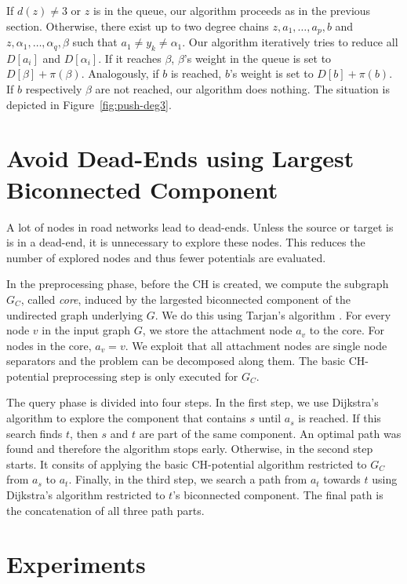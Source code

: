 \documentclass[a4paper,UKenglish,cleveref, autoref]{lipics-v2019}
\begin{document}
If $d(z)\neq 3$ or $z$ is in the queue, our algorithm proceeds as in the previous section.
Otherwise, there exist up to two degree chains $z,a_1,\ldots,a_p,b$ and $z,\alpha_1,\ldots,\alpha_q,\beta$ such that $a_1\neq y_k \neq \alpha_1$.
Our algorithm iteratively tries to reduce all $D[a_i]$ and $D[\alpha_i]$.
If it reaches $\beta$, $\beta$'s weight in the queue is set to $D[\beta]+\pi(\beta)$.
Analogously, if $b$ is reached, $b$'s weight is set to $D[b]+\pi(b)$.
If $b$ respectively $\beta$ are not reached, our algorithm does nothing.
The situation is depicted in Figure~\ref{fig:push-deg3}.

\section{Avoid Dead-Ends using Largest Biconnected Component}

A lot of nodes in road networks lead to dead-ends.
Unless the source or target is is in a dead-end, it is unnecessary to explore these nodes.
This reduces the number of explored nodes and thus fewer potentials are evaluated.

In the preprocessing phase, before the CH is created, we compute the subgraph $G_C$, called \emph{core}, induced by the largested biconnected component of the undirected graph underlying $G$.
We do this using Tarjan's algorithm \cite{t-dfslg2-72}.
For every node $v$ in the input graph $G$, we store the attachment node $a_v$ to the core.
For nodes in the core, $a_v=v$.
We exploit that all attachment nodes are single node separators and the problem can be decomposed along them.
The basic CH-potential preprocessing step is only executed for $G_C$.

The query phase is divided into four steps.
In the first step, we use Dijkstra's algorithm to explore the component that contains $s$ until $a_s$ is reached.
If this search finds $t$, then $s$ and $t$ are part of the same component.
An optimal path was found and therefore the algorithm stops early.
Otherwise, in the second step starts.
It consits of applying the basic CH-potential algorithm restricted to $G_C$ from $a_s$ to $a_t$.
Finally, in the third step, we search a path from $a_t$ towards $t$ using Dijkstra's algorithm restricted to $t$'s biconnected component.
The final path is the concatenation of all three path parts.


\section{Experiments}
\end{document}
